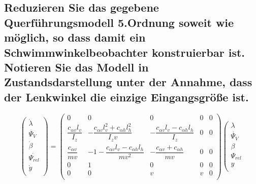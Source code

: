 \subsection{Reduzieren Sie das gegebene Querführungsmodell 5.Ordnung soweit wie möglich, so dass damit ein
    Schwimmwinkelbeobachter konstruierbar ist. Notieren Sie das Modell in Zustandsdarstellung unter der
    Annahme, dass der Lenkwinkel die einzige Eingangsgröße ist.}
\begin{equation}
    \left(
    \begin{array}{c}
            \dot{\lambda}    \\
            \ddot{\Psi_V}    \\
            \dot{\beta}      \\
            \dot{\Psi_{rel}} \\
            \dot{y}          \\
        \end{array}
    \right)=
    \left(
    \begin{array}{ccccc}
            0                                & 0                                                        & 0                                                   & 0 & 0 \\
            \dfrac{c_{\alpha v}l_{v}}{I_{z}} & -\dfrac{c_{\alpha v}l_{v}^2+c_{\alpha h}l_{h}^2}{I_{z}v} & -\dfrac{c_{\alpha v}l_{v}-c_{\alpha h}l_{h}}{I_{z}} & 0 & 0 \\
            \dfrac{c_{\alpha v}}{mv}         & -1-\dfrac{c_{\alpha v}l_{v}-c_{\alpha h}l_{h}}{mv^2}     & -\dfrac{c_{\alpha v}+c_{\alpha h}}{mv}              & 0 & 0 \\
            0                                & 1                                                        & 0                                                   & 0 & 0 \\
            0                                & 0                                                        & v                                                   & v & 0 \\
        \end{array}
    \right)
    \left(
    \begin{array}{c}
            \lambda      \\
            \dot{\Psi_V} \\
            \beta        \\
            \Psi_{rel}   \\
            y            \\

\end{array}
\end{equation}
